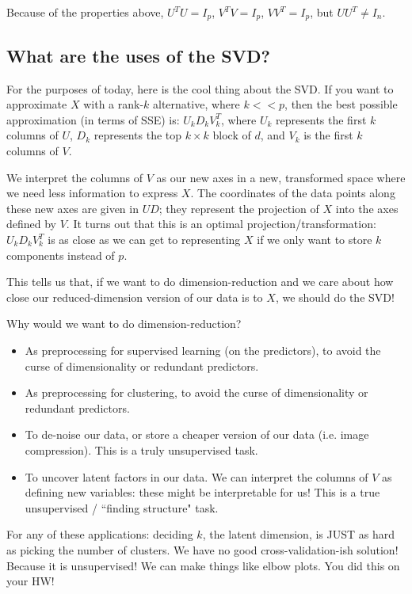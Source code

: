Because of the properties above, $U^T U = I_p$, $V^T V = I_p$, $VV^T = I_p$, but  $UU^T \neq I_n$. 

\subsection{What are the uses of the SVD?}

For the purposes of today, here is the cool thing about the SVD. If you want to approximate $X$ with a rank-$k$ alternative, where $k << p$, then the best possible approximation (in terms of SSE) is:
$
U_k D_{k} V_{k}^T
$, where $U_k$ represents the first $k$ columns of $U$, $D_k$ represents the top $k \times k$ block of $d$, and $V_k$ is the first $k$ columns of $V$. 

We interpret the columns of $V$ as our new axes in a new, transformed space where we need less information to express $X$. The coordinates of the data points along these new axes are given in $U D$; they represent the projection of $X$ into the axes defined by $V$. It turns out that this is an optimal projection/transformation: $U_k D_{k} V_{k}^T$ is as close as we can get to representing $X$ if we only want to store $k$ components instead of $p$. 

This tells us that, if we want to do dimension-reduction and we care about how close our reduced-dimension version of our data is to $X$, we should do the SVD! 

Why would we want to do dimension-reduction?

\begin{itemize}
\item As preprocessing for supervised learning (on the predictors), to avoid the curse of dimensionality or redundant predictors. 
\item As preprocessing for clustering, to avoid the curse of dimensionality or redundant predictors. 
\item To de-noise our data, or store a cheaper version of our data (i.e. image compression). This is a truly unsupervised task. 
\item To uncover latent factors in our data. We can interpret the columns of $V$ as defining new variables: these might be interpretable for us! This is a true unsupervised / ``finding structure" task. 
\end{itemize}

For any of these applications: deciding $k$, the latent dimension, is JUST as hard as picking the number of clusters. We have no good cross-validation-ish solution! Because it is unsupervised! We can make things like elbow plots. You did this on your HW! 

